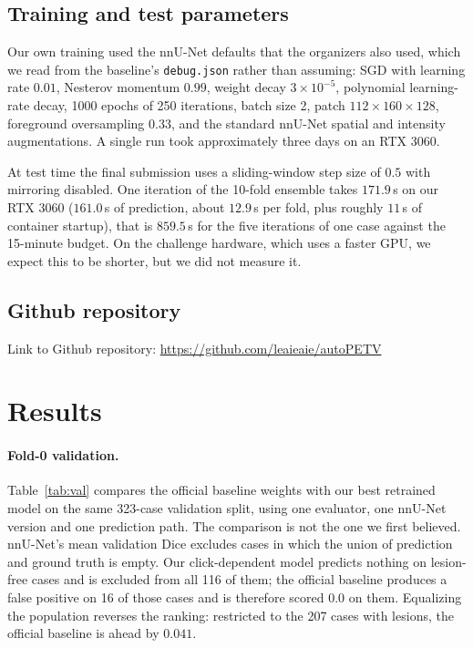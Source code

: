 \documentclass[runningheads]{llncs}
\begin{document}
\subsection{Training and test parameters}

Our own training used the nnU-Net defaults that the organizers also used, which
we read from the baseline's \texttt{debug.json} rather than assuming: SGD with
learning rate $0.01$, Nesterov momentum $0.99$, weight decay $3\times10^{-5}$,
polynomial learning-rate decay, 1000 epochs of 250 iterations, batch size 2,
patch $112\times160\times128$, foreground oversampling $0.33$, and the standard
nnU-Net spatial and intensity augmentations. A single run took approximately
three days on an RTX 3060.

At test time the final submission uses a sliding-window step size of $0.5$ with
mirroring disabled. One iteration of the 10-fold ensemble takes $171.9$\,s on
our RTX 3060 ($161.0$\,s of prediction, about $12.9$\,s per fold, plus roughly
$11$\,s of container startup), that is $859.5$\,s for the five iterations of one
case against the 15-minute budget. On the challenge hardware, which uses a
faster GPU, we expect this to be shorter, but we did not measure it.

\subsection{Github repository}

Link to Github repository: \url{https://github.com/leaieaie/autoPETV}

\section{Results}
\label{sec:results}

\paragraph{Fold-0 validation.}
Table~\ref{tab:val} compares the official baseline weights with our best
retrained model on the same 323-case validation split, using one evaluator, one
nnU-Net version and one prediction path. The comparison is not the one we first
believed. nnU-Net's mean validation Dice excludes cases in which the union of
prediction and ground truth is empty. Our click-dependent model predicts
nothing on lesion-free cases and is excluded from all 116 of them; the official
baseline produces a false positive on 16 of those cases and is therefore scored
$0.0$ on them. Equalizing the population reverses the ranking: restricted to
the 207 cases with lesions, the official baseline is ahead by $0.041$.
\end{document}
